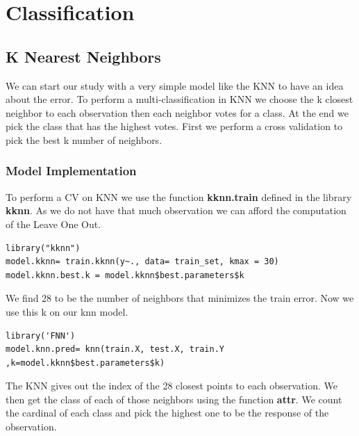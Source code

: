 \documentclass[]{report}
\begin{document}
\section{Classification}

\subsection{K Nearest Neighbors}
We can start our study with a very simple model like the KNN to have an idea about the error. To perform a multi-classification in KNN we choose the k closest neighbor to each observation then each neighbor votes for a  class. At the end we pick the class that has the highest votes. 
First we perform a cross validation to pick the best k number of neighbors.

\subsubsection{Model Implementation}
To perform a CV on KNN we use the function \textbf{kknn.train} defined in the library \textbf{kknn}. As we do not have that much observation we can afford the computation of the Leave One Out.
\begin{lstlisting}
library("kknn")
model.kknn= train.kknn(y~., data= train_set, kmax = 30)
model.kknn.best.k = model.kknn$best.parameters$k
\end{lstlisting}
We find 28 to be the number of neighbors that minimizes the train error. Now we use this k on our knn model.

\begin{lstlisting}
library('FNN')
model.knn.pred= knn(train.X, test.X, train.Y ,k=model.kknn$best.parameters$k)
\end{lstlisting}

The KNN gives out the index of the 28 closest points to each observation. We then get the class of each of those neighbors using the function\textbf{ attr}. We count the cardinal of each class and pick the highest one to be the response of the observation.
\pagebreak
\end{document}
